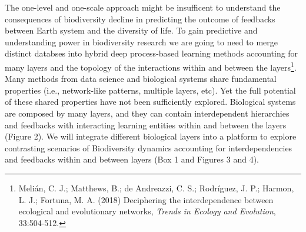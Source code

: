 \documentclass[authoryear,1p,12pt]{elsarticle}
\begin{document}
The one-level and one-scale approach might be insufficent to
understand the consequences of biodiversity decline in predicting the
outcome of feedbacks between Earth system and the diversity of
life. To gain predictive and understanding power in biodiversity
research we are going to need to merge distinct databses into hybrid
deep process-based learning methods accounting for many layers and the
topology of the interactions within and between the
layers\footnote{Melián, C. J.; Matthews, B.; de Andreazzi, C. S.;
  Rodríguez, J. P.; Harmon, L. J.; Fortuna, M. A. (2018) Deciphering
  the interdependence between ecological and evolutionary networks,
  {\em Trends in Ecology and Evolution}, 33:504-512.}. Many methods
from data science and biological systems share fundamental properties
(i.e., network-like patterns, multiple layers, etc). Yet the full
potential of these shared properties have not been sufficiently
explored. Biological systems are composed by many layers, and they can
contain interdependent hierarchies and feedbacks with interacting
learning entities within and between the layers (Figure 2). We will
integrate different biological layers into a platform to explore
contrasting scenarios of Biodiversity dynamics accounting for
interdependencies and feedbacks within and between layers (Box 1 and
Figures 3 and 4).
\end{document}
